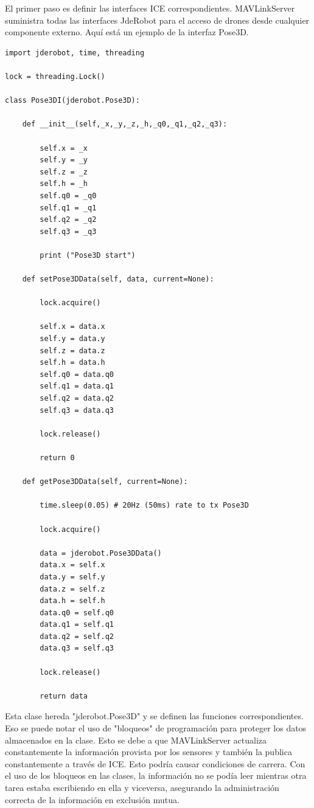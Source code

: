 El primer paso es definir las interfaces ICE correspondientes. MAVLinkServer suministra todas las interfaces JdeRobot para el acceso de drones desde cualquier componente externo. Aquí está un ejemplo de la interfaz Pose3D.

\begin{lstlisting}[frame=single]
import jderobot, time, threading

lock = threading.Lock()

class Pose3DI(jderobot.Pose3D):

    def __init__(self,_x,_y,_z,_h,_q0,_q1,_q2,_q3):

        self.x = _x
        self.y = _y
        self.z = _z
        self.h = _h
        self.q0 = _q0
        self.q1 = _q1
        self.q2 = _q2
        self.q3 = _q3

        print ("Pose3D start")

    def setPose3DData(self, data, current=None):

        lock.acquire()

        self.x = data.x
        self.y = data.y
        self.z = data.z
        self.h = data.h
        self.q0 = data.q0
        self.q1 = data.q1
        self.q2 = data.q2
        self.q3 = data.q3

        lock.release()

        return 0

    def getPose3DData(self, current=None):

        time.sleep(0.05) # 20Hz (50ms) rate to tx Pose3D

        lock.acquire()

        data = jderobot.Pose3DData()
        data.x = self.x
        data.y = self.y
        data.z = self.z
        data.h = self.h
        data.q0 = self.q0
        data.q1 = self.q1
        data.q2 = self.q2
        data.q3 = self.q3

        lock.release()

        return data
\end{lstlisting}  

Esta clase hereda "jderobot.Pose3D" y se definen las funciones correspondientes. Eso
se puede notar el uso de "bloqueos" de programación para proteger los datos almacenados en la clase. Esto se debe a que MAVLinkServer actualiza constantemente la información provista por los sensores y también la publica constantemente a través de ICE. Esto podría causar condiciones de carrera. Con el uso de los bloqueos en las clases, la información no se podía leer mientras otra tarea estaba escribiendo en ella y viceversa, asegurando la administración correcta de la información en exclusión mutua.

